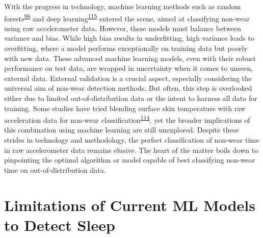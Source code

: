 \documentclass[
  10pt,
]{scrbook}
\begin{document}
With the progress in technology, machine learning methods such as random
forests\textsuperscript{\protect\hyperlink{ref-sundararajan_sleep_2021}{98}}
and deep
learning\textsuperscript{\protect\hyperlink{ref-syed_novel_2021}{115}}
entered the scene, aimed at classifying non-wear using raw accelerometer
data. However, these models must balance between variance and bias.
While high bias results in underfitting, high variance leads to
overfitting, where a model performs exceptionally on training data but
poorly with new data. These advanced machine learning models, even with
their robust performance on test data, are wrapped in uncertainty when
it comes to unseen, external data. External validation is a crucial
aspect, especially considering the universal aim of non-wear detection
methods. But often, this step is overlooked either due to limited
out-of-distribution data or the intent to harness all data for training.
Some studies have tried blending surface skin temperature with raw
acceleration data for non-wear
classification\textsuperscript{\protect\hyperlink{ref-zhou_classification_2015}{114}},
yet the broader implications of this combination using machine learning
are still unexplored. Despite these strides in technology and
methodology, the perfect classification of non-wear time in raw
accelerometer data remains elusive. The heart of the matter boils down
to pinpointing the optimal algorithm or model capable of best
classifying non-wear time on out-of-distribution data.

\hypertarget{limitations-of-current-ml-models-to-detect-sleep}{%
\section{Limitations of Current ML Models to Detect
Sleep}\label{limitations-of-current-ml-models-to-detect-sleep}}
\end{document}
